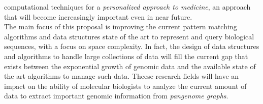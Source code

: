 \documentclass[a4paper,11pt, oneside]{article}
\newcommand{\pb}[1]{\todo[backgroundcolor=red]{\textbf{PB} #1}}
\newcommand{\dc}[1]{\todo[backgroundcolor=yellow]{\textbf{DC} #1}}
\begin{document}
computational techniques for a \textit{personalized approach to medicine},
an approach that will become increasingly important even in near future.\\ 
The main focus of this proposal is improving the current pattern matching
algorithms and data structures state of the art to represent and query
biological sequences, with a focus on space 
complexity. In fact, the design of data structures and algorithms to handle
large collections of data will fill the current gap that exists between the
exponential growth of genomic data and the available state of the art algorithms
to manage  
such data. Theese research fields will have an impact on the ability of
molecular biologists to analyze the current amount of data to extract important
genomic information from \textit{pangenome graphs}. 
\end{document}
